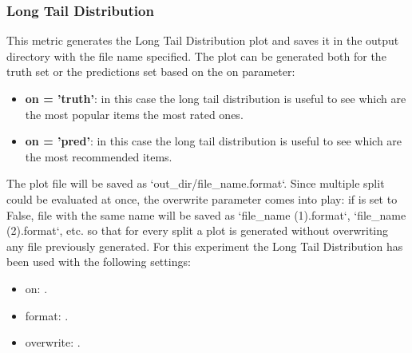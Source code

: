\documentclass[11pt]{article}
\begin{document}
\subsubsection{Long Tail Distribution}\label{sec:LTD}
This metric generates the Long Tail Distribution plot and saves it in the output directory with the file name
specified. The plot can be generated both for the truth set or the predictions set based on the on parameter:
\begin{itemize}
    \item \textbf{on = 'truth'}: in this case the long tail distribution is useful to see which are the most popular items
       the most rated ones.
    \item \textbf{on = 'pred'}: in this case the long tail distribution is useful to see which are the most recommended
        items.
\end{itemize}
\hfill\break
\hfill\break
The plot file will be saved as `out_dir/file_name.format`.
Since multiple split could be evaluated at once, the overwrite parameter comes into play:
if is set to False, file with the same name will be saved as `file_name (1).format`, `file_name (2).format`, etc.
so that for every split a plot is generated without overwriting any file previously generated.
\hfill\break
\hfill\break
For this experiment the Long Tail Distribution has been used with the following settings:
\begin{itemize}
    \item on: .
    \item format: .
    \item overwrite: .
\end{itemize}
\hfill\break
\hfill\break


\end{document}
